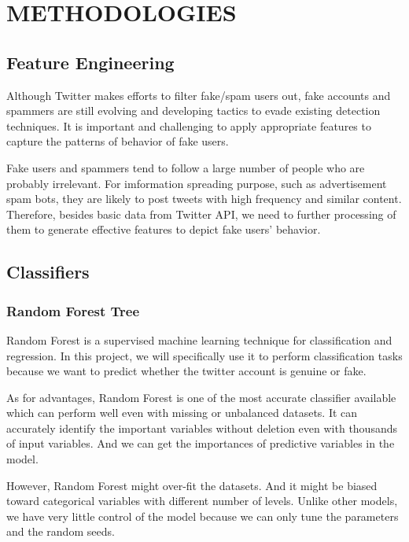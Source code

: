 \documentclass[a4paper, 12pt]{report}
\begin{document}
\section*{METHODOLOGIES}
\subsection*{Feature Engineering}
Although Twitter makes efforts to filter fake/spam users out, fake accounts and spammers are still evolving and developing tactics to evade existing detection techniques. It is important and challenging to apply appropriate features to capture the patterns of behavior of fake users. \par

\noindent Fake users and spammers tend to follow a large number of people who are probably irrelevant. For imformation spreading purpose, such as advertisement spam bots, they are likely to post tweets with high frequency and similar content. Therefore, besides basic data from Twitter API, we need to further processing of them to generate effective features to depict fake users' behavior.

\subsection*{Classifiers}
\subsubsection*{Random Forest Tree}
Random Forest is a supervised machine learning technique for classification and regression. In this project, we will specifically use it to perform classification tasks because  we want to predict whether the twitter account is genuine or fake. \par

\noindent As for advantages, Random Forest is one of the most accurate classifier available which can perform well even with missing or unbalanced datasets. It can accurately identify the important variables without deletion even with thousands of input variables. And we can get the importances of predictive variables in the model. \par

\noindent However, Random Forest might over-fit the datasets. And it might be biased toward categorical variables with different number of levels. Unlike other models, we have very little control of the model because we can only tune the parameters and the random seeds.
\end{document}
